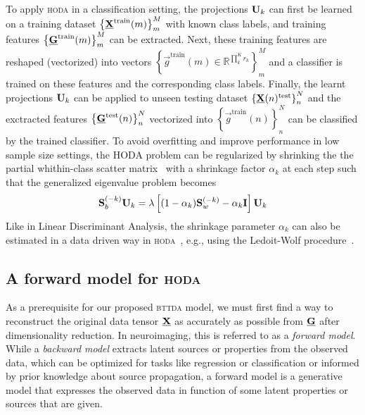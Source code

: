 \documentclass[twocolumn]{article}
\begin{document}
To apply \textsc{hoda} in a classification setting, the projections $\mathbf{U}_k$
can first be learned on a training dataset
$\left\{\underline{\mathbf{X}}^\text{train}(m)\right\}_m^M$ with known class labels, and
training features $\left\{\underline{\mathbf{G}}^\text{train}(m)\right\}_m^M$ can be extracted.
Next, these training features are reshaped (vectorized) into vectors
$\left\{\vec{g}^\text{train}(m) \in \mathbb{R}^{\prod_k^Kr_k}\right\}_m^M$ and a classifier is
trained on these features and the corresponding class labels.
Finally, the learnt projections $\mathbf{U}_k$ can be applied to unseen testing
dataset $\left\{\underline{\mathbf{X}}(n)^\text{test}\right\}_n^N$ and the exctracted features
$\left\{\underline{\mathbf{G}}^\text{test}(n)\right\}_n^N$ vectorized into
$\left\{\vec{g}^\text{train}(n)\right\}_n^N$ can be
classified by the trained classifier.
To avoid overfitting and improve performance in low sample size settings, the
\textsc{HODA} problem can be regularized by shrinking the the partial
whithin-class scatter matrix~\cite{Phan2010} with a shrinkage factor
$\alpha_k$ at each step such that the generalized eigenvalue problem becomes
\begin{equation}
	\mathbf{S}_b^{(-k)}\mathbf{U}_k =
\mathbf{\lambda}\left[(1-\alpha_k)\mathbf{S}_w^{(-k)}-\alpha_k\mathbf{I}\right]\mathbf{U}_k
\end{equation}
Like in Linear Discriminant Analysis, the shrinkage parameter $\alpha_k$ can
also be estimated in a data driven way in \textsc{hoda}~\cite{Jorajuria2022},
e.g., using the Ledoit-Wolf procedure~\cite{Ledoit2003}.


\subsection{A forward model for \textsc{hoda}}
As a prerequisite for our proposed \textsc{bttda} model, we must first find a
way to reconstruct the original data tensor $\underline{\mathbf{X}}$ as accurately as possible
from $\underline{\mathbf{G}}$ after dimensionality reduction.
In neuroimaging, this is referred to as a \emph{forward model}.
While a \emph{backward model} extracts latent sources or properties from the observed
data, which can be optimized for tasks like regression or classification or
informed by prior knowledge about source propagation, a forward model is a
generative model that expresses the observed data in function of some latent
properties or sources that are given.
\end{document}

